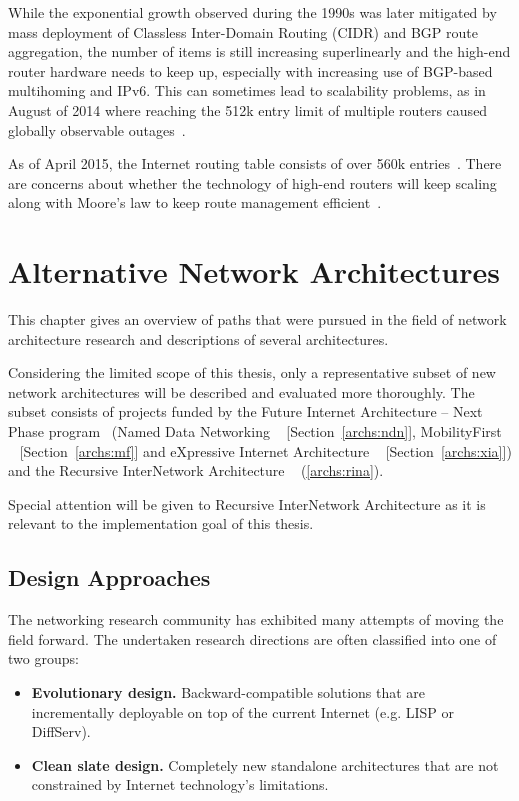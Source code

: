         While the exponential growth observed during the 1990s was later mitigated by mass deployment of Classless Inter-Domain Routing (CIDR) and BGP route aggregation, the number of items is still increasing superlinearly and the high-end router hardware needs to keep up, especially with increasing use of BGP-based multihoming and IPv6. This can sometimes lead to scalability problems, as in August of 2014 where reaching the 512k entry limit of multiple routers caused globally observable outages~\cite{512k_day}.

        As of April 2015, the Internet routing table consists of over 560k entries~\cite{bgpgrow}. There are concerns about whether the technology of high-end routers will keep scaling along with Moore's law to keep route management efficient~\cite{rfc4984}.


\chapter{Alternative Network Architectures}\label{archs}

    This chapter gives an overview of paths that were pursued in the field of network architecture research and descriptions of several architectures.

    Considering the limited scope of this thesis, only a representative subset of new network architectures will be described and evaluated more thoroughly. The subset consists of projects funded by the Future Internet Architecture -- Next Phase program~\cite{fia} (Named Data Networking ~\cite{ndn} [Section~\ref{archs:ndn}], MobilityFirst ~\cite{MobilityFirst} [Section~\ref{archs:mf}] and eXpressive Internet Architecture ~\cite{xia} [Section~\ref{archs:xia}]) and the Recursive InterNetwork Architecture ~\cite{Patterns} (\ref{archs:rina}).

    Special attention will be given to Recursive InterNetwork Architecture as it is relevant to the implementation goal of this thesis.

    \section{Design Approaches}

        The networking research community has exhibited many attempts of moving the field forward. The undertaken research directions are often classified into one of two groups:

        \begin{itemize}
            \item \textbf{Evolutionary design.} Backward-compatible solutions that are incrementally deployable on top of the current Internet (e.g. LISP or DiffServ).
            \item \textbf{Clean slate design.} Completely new standalone architectures that are not constrained by Internet technology's limitations.
        \end{itemize}

